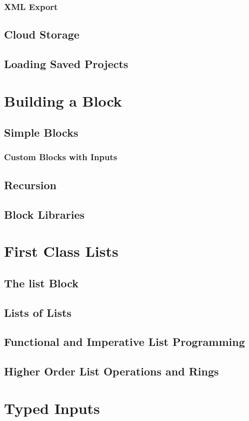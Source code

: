 \documentclass{report}
\begin{document}
\subsection{XML Export}
\section{Cloud Storage}
\section{Loading Saved Projects}
\chapter{Building a Block}
\section{Simple Blocks}
\subsection{Custom Blocks with Inputs}
\section{Recursion}
\section{Block Libraries}
\chapter{First Class Lists}
\section{The list Block}
\section{Lists of Lists}
\section{Functional and Imperative List Programming}
\section{Higher Order List Operations and Rings}
\chapter{Typed Inputs}
\end{document}
